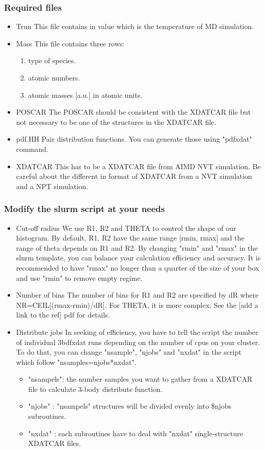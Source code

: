 \documentclass[11pt]{article}
\begin{document}
\subsubsection{Required files}
\label{sec:org7658a5c}
\begin{itemize}
\item Trun
This file contains in value which is the temperature of MD simulation.
\item Mass
This file contains three rows:
\begin{enumerate}
\item type of species.
\item atomic numbers.
\item atomic masses [a.u.] in atomic units.
\end{enumerate}
\item POSCAR
The POSCAR should be consistent with the XDATCAR file but not
necessary to be one of the structures in the XDATCAR file.
\item pdf.HH
Pair distribution functions. You can generate those using "pdfxdat"
command.
\item XDATCAR 
This has to be a XDATCAR file from AIMD NVT simulation. Be careful
about the different in format of XDATCAR from a NVT simulation and a
NPT simulation.
\end{itemize}

\subsubsection{Modify the slurm script at your needs}
\label{sec:org17c195f}
\begin{itemize}
\item Cut-off radius
We use R1, R2 and THETA to control the shape of our histogram. By
default, R1, R2 have the same range [rmin, rmax] and the range of
theta depends on R1 and R2. By changing "rmin" and "rmax" in the slurm template, you can
balance your calculation efficiency and accuracy.
It is recommended to have "rmax" no longer than a quarter of the
size of your box and use "rmin" to remove empty regime.
\item Number of bins
The number of bins for R1 and R2 are specified by dR where
NR=CEIL[(rmax-rmin)/dR]. For THETA, it is more complex. See the
[add a link to the ref] pdf for details.
\item Distribute jobs
In seeking of efficiency, you have to tell the script the number of
individual 3bdfxdat runs depending on the number of cpus on your
cluster. To do that, you can change "nsample", "njobs" and "nxdat"
in the script which follow "nsamples=njobs*nxdat".
\begin{itemize}
\item "nsampels": the number samples you want to gather from a XDATCAR
file to calculate 3-body distribute function.
\item "njobs" : "nsampels" structures will be divided evenly into \$njobs
subroutines.
\item "nxdat" : each subroutines have to deal with "nxdat"
single-structure XDATCAR files.
\end{itemize}
\end{itemize}
\end{document}
